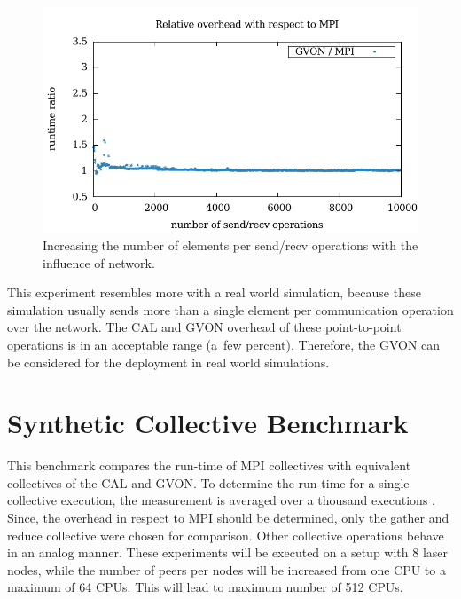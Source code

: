 \begin{figure}[H]
\begin{minipage}[t]{0.5\textwidth}
    \includegraphics[width=\textwidth]{plots/50_nsize_network_overhead_gvon_laser}
  \end{minipage}%
  \caption{Increasing the number of elements per send/recv operations
    with the influence of network.}
  \label{fig:nsend_network}
\end{figure}

\noindent This experiment resembles more with a real world simulation,
because these simulation usually sends more than a single element per
communication operation over the network.  The CAL and GVON overhead
of these point-to-point operations is in an acceptable range (a~few
percent).  Therefore, the GVON can be considered for the deployment in
real world simulations.


\section{Synthetic Collective Benchmark}
This benchmark compares the run-time of MPI collectives with
equivalent collectives of the CAL and GVON.  To determine the run-time
for a single collective execution, the measurement is averaged over a
thousand executions .  Since, the overhead in respect to MPI should be
determined, only the gather and reduce collective were chosen for
comparison. Other collective operations behave in an analog
manner. These experiments will be executed on a setup with 8 laser
nodes, while the number of peers per nodes will be increased from one
CPU to a maximum of 64 CPUs.  This will lead to maximum number of 512
CPUs.

